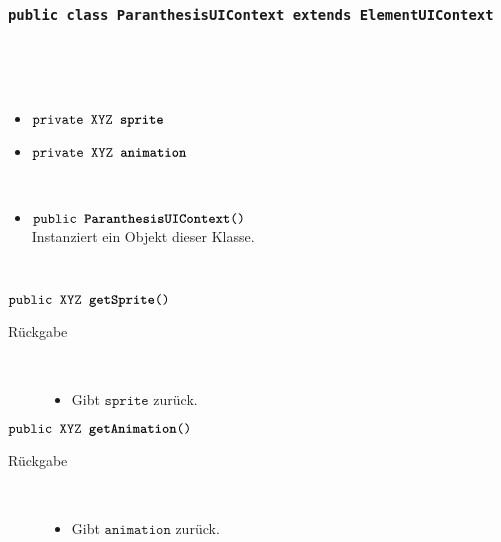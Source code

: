 		\subsubsection{\normalfont \texttt{public class \textbf{ParanthesisUIContext} extends ElementUIContext}}

\begin{description}
\item[Beschreibung] \hfill \\ 
\item[Attribute] \hfill \\
	\vspace{-.8cm}
	\begin{itemize}	
		\item $\texttt{private XYZ \textbf{sprite}}$ \\ 		
		\item $\texttt{private XYZ \textbf{animation}}$ \\ 
		\end{itemize}
	
\item[Konstruktoren] \hfill \\
	\vspace{-.8cm}
	\begin{itemize}
		\item $\texttt{public \textbf{ParanthesisUIContext}()}$ \\ Instanziert ein Objekt dieser Klasse.

	\end{itemize}
	
\item[Methoden] \hfill \\
	\vspace{-.8cm}
		\item $\texttt{public XYZ \textbf{getSprite}()}$ \\ 
		\begin{description}
			\item[Rückgabe] \hfill \\
			\vspace{-.8cm}
			\begin{itemize}
				\item Gibt $\texttt{sprite}$ zurück.
			\end{itemize}
			\end{description}
			
		\item $\texttt{public XYZ \textbf{getAnimation}()}$ \\ 
		\begin{description}
			\item[Rückgabe] \hfill \\
			\vspace{-.8cm}
			\begin{itemize}
				\item Gibt $\texttt{animation}$ zurück.
			\end{itemize}
			\end{description}
			
		
	\end{description}
			

